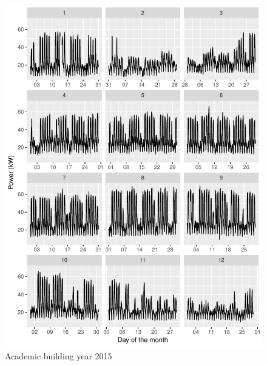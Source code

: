 \documentclass[11pt, oneside]{article}   	%
\begin{document}
\begin{figure}
\includegraphics[keepaspectratio]{acad_build_Y2015.pdf}
\caption{Academic building year 2015 }
\end{figure}
\end{document}

